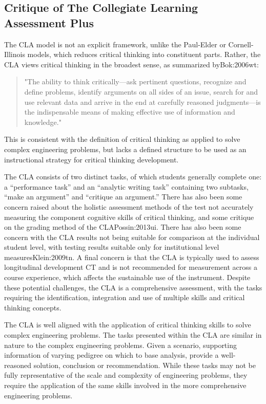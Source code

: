 \subsection{Critique of The Collegiate Learning Assessment Plus}

The CLA model is not an explicit framework, unlike the Paul-Elder or Cornell-Illinois models, which reduces critical thinking into constituent parts. Rather, the CLA views critical thinking in the broadest sense, as summarized by{Bok:2006wt}:

\begin{quote}
"The ability to think critically—ask pertinent questions, recognize and define problems, identify arguments on all sides of an issue, search for and use relevant data and arrive in the end at carefully reasoned judgments—is the indispensable means of making effective use of information and knowledge."
\end{quote}

This is consistent with the definition of critical thinking as applied to solve complex engineering problems, but lacks a defined structure to be used as an instructional strategy for critical thinking development. 

The CLA consists of two distinct tasks, of which students generally complete one: a “performance task” and an “analytic writing task” containing two subtasks, “make an argument” and “critique an argument.” There has also been some concern raised about the holistic assessment methods of the test not accurately measuring the component cognitive skills of critical thinking, and some critique on the grading method of the CLA{Possin:2013ui}. There has also been some concern with the CLA results not being suitable for comparison at the individual student level, with testing results suitable only for institutional level measures{Klein:2009tn}.  A final concern is that the CLA is typically used to assess longitudinal development CT and is not recommended for measurement across a course experience, which affects the sustainable use of the instrument.  Despite these potential challenges, the CLA is a comprehensive assessment, with the tasks requiring the identification, integration and use of multiple skills and critical thinking concepts.  

The CLA is well aligned with the application of critical thinking skills to solve complex engineering problems.  The tasks presented within the CLA are similar in nature to the complex engineering problems.  Given a scenario, supporting information of varying pedigree on which to base analysis, provide a well-reasoned solution, conclusion or recommendation.   While these tasks may not be fully representative of the scale and complexity of engineering problems, they require the application of the same skills involved in the more comprehensive engineering problems.
